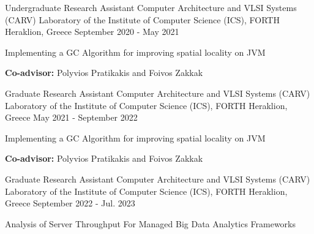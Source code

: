 

\begin{cventries}


  \cventry
    {Undergraduate Research Assistant} %
    {Computer Architecture and VLSI Systems (CARV) Laboratory of the Institute of Computer Science (ICS), FORTH} %
    {Heraklion, Greece} %
    {September 2020 - May 2021} %
    {
      \begin{cvitems} %
        \item {Implementing a GC Algorithm for improving spatial locality on JVM}
        \item{\textbf{Co-advisor:} Polyvios Pratikakis and Foivos Zakkak}
      \end{cvitems}
    }
  \cventry
    {Graduate Research Assistant} %
    {Computer Architecture and VLSI Systems (CARV) Laboratory of the Institute of Computer Science (ICS), FORTH} %
    {Heraklion, Greece} %
    {May 2021 - September 2022} %
    {
      \begin{cvitems} %
        \item {Implementing a GC Algorithm for improving spatial locality on JVM}
        \item{\textbf{Co-advisor:} Polyvios Pratikakis and Foivos Zakkak}
      \end{cvitems}
    }
  \cventry
    {Graduate Research Assistant} %
    {Computer Architecture and VLSI Systems (CARV) Laboratory of the Institute of Computer Science (ICS), FORTH} %
    {Heraklion, Greece} %
    {September 2022 - Jul. 2023} %
    {
      \begin{cvitems} %
        \item {Analysis of Server Throughput For Managed Big Data Analytics Frameworks}

\end{cvitems}}
\end{cventries}
